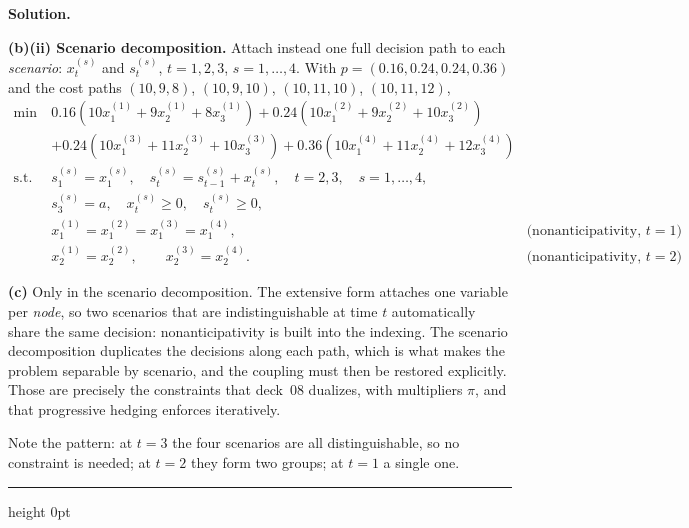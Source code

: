 \documentclass[11pt]{article}
\newenvironment{solution}
    {\par\nobreak\smallskip\noindent\textbf{Solution.}\par\nobreak\smallskip}
    {\par\medskip\hrule height 0pt\medskip}
\begin{document}
\begin{solution}
\textbf{(b)(ii) Scenario decomposition.} Attach instead one full decision path to
each \emph{scenario}: $x_t^{(s)}$ and $s_t^{(s)}$, $t = 1,2,3$, $s = 1,\ldots,4$.
With $p = (0.16, 0.24, 0.24, 0.36)$ and the cost paths $(10,9,8)$, $(10,9,10)$,
$(10,11,10)$, $(10,11,12)$,
\begin{align*}
\min\ & 0.16\left(10x_1^{(1)} + 9x_2^{(1)} + 8x_3^{(1)}\right)
      + 0.24\left(10x_1^{(2)} + 9x_2^{(2)} + 10x_3^{(2)}\right) \\
& + 0.24\left(10x_1^{(3)} + 11x_2^{(3)} + 10x_3^{(3)}\right)
  + 0.36\left(10x_1^{(4)} + 11x_2^{(4)} + 12x_3^{(4)}\right) \\
\text{s.t. } & s_1^{(s)} = x_1^{(s)}, \quad
 s_t^{(s)} = s_{t-1}^{(s)} + x_t^{(s)}, \quad t = 2,3, \quad s = 1,\ldots,4, \\
& s_3^{(s)} = a, \quad x_t^{(s)} \geq 0, \quad s_t^{(s)} \geq 0, \\
& x_1^{(1)} = x_1^{(2)} = x_1^{(3)} = x_1^{(4)}, & \text{(nonanticipativity, $t=1$)} \\
& x_2^{(1)} = x_2^{(2)}, \qquad x_2^{(3)} = x_2^{(4)}. & \text{(nonanticipativity, $t=2$)}
\end{align*}

\textbf{(c)} Only in the scenario decomposition. The extensive form attaches one
variable per \emph{node}, so two scenarios that are indistinguishable at time $t$
automatically share the same decision: nonanticipativity is built into the
indexing. The scenario decomposition duplicates the decisions along each path,
which is what makes the problem separable by scenario, and the coupling must
then be restored explicitly. Those are precisely the constraints that deck~08
dualizes, with multipliers $\pi$, and that progressive hedging enforces
iteratively.

Note the pattern: at $t = 3$ the four scenarios are all distinguishable, so no
constraint is needed; at $t = 2$ they form two groups; at $t = 1$ a single one.
\end{solution}
\end{document}
